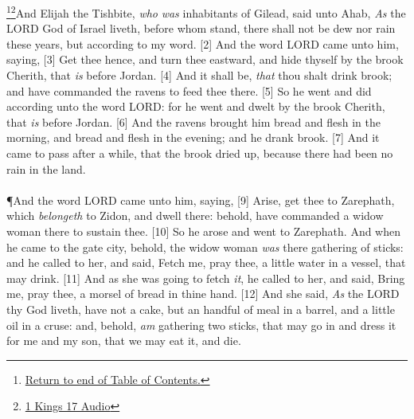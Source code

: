 \footnote{\textcolor[cmyk]{0.99998,1,0,0}{\hyperlink{TOC}{Return to end of Table of Contents.}}}\footnote{\href{https://audiobible.com/bible/1_kings_17.html}{\textcolor[cmyk]{0.99998,1,0,0}{1 Kings 17 Audio}}}\textcolor[cmyk]{0.99998,1,0,0}{And Elijah the Tishbite, \emph{who} \emph{was}  inhabitants of Gilead, said unto Ahab, \emph{As} the LORD God of Israel liveth, before whom  stand, there shall not be dew nor rain these years, but according to my word.}
[2] \textcolor[cmyk]{0.99998,1,0,0}{And the word  LORD came unto him, saying,}
[3] \textcolor[cmyk]{0.99998,1,0,0}{Get thee hence, and turn thee eastward, and hide thyself by the brook Cherith, that \emph{is} before Jordan.}
[4] \textcolor[cmyk]{0.99998,1,0,0}{And it shall be, \emph{that} thou shalt drink  brook; and  have commanded the ravens to feed thee there.}
[5] \textcolor[cmyk]{0.99998,1,0,0}{So he went and did according unto the word  LORD: for he went and dwelt by the brook Cherith, that \emph{is} before Jordan.}
[6] \textcolor[cmyk]{0.99998,1,0,0}{And the ravens brought him bread and flesh in the morning, and bread and flesh in the evening; and he drank  brook.}
[7] \textcolor[cmyk]{0.99998,1,0,0}{And it came to pass after a while, that the brook dried up, because there had been no rain in the land.}\\
\\
\P  \textcolor[cmyk]{0.99998,1,0,0}{And the word  LORD came unto him, saying,}
[9] \textcolor[cmyk]{0.99998,1,0,0}{Arise, get thee to Zarephath, which \emph{belongeth} to Zidon, and dwell there: behold,  have commanded a widow woman there to sustain thee.}
[10] \textcolor[cmyk]{0.99998,1,0,0}{So he arose and went to Zarephath. And when he came to the gate  city, behold, the widow woman \emph{was} there gathering of sticks: and he called to her, and said, Fetch me,  pray thee, a little water in a vessel, that  may drink.}
[11] \textcolor[cmyk]{0.99998,1,0,0}{And as she was going to fetch \emph{it}, he called to her, and said, Bring me,  pray thee, a morsel of bread in thine hand.}
[12] \textcolor[cmyk]{0.99998,1,0,0}{And she said, \emph{As} the LORD thy God liveth,  have not a cake, but an handful of meal in a barrel, and a little oil in a cruse: and, behold,  \emph{am} gathering two sticks, that  may go in and dress it for me and my son, that we may eat it, and die.}
